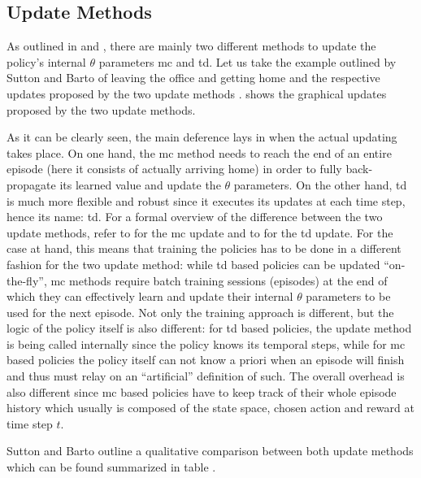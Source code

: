 \documentclass{seal_thesis}
\begin{document}
\subsection{Update Methods}
\label{subsec:update_methods}

As outlined in  and , there are mainly two different methods to update the policy's internal $\theta$ parameters \ie \gls{mc} and \gls{td}. Let us take the example outlined by Sutton and Barto of leaving the office and getting home and the respective updates proposed by the two update methods \cite[p. 130]{Sutton2017}.  shows the graphical updates proposed by the two update methods.


As it can be clearly seen, the main deference lays in when the actual updating takes place. On one hand, the \gls{mc} method needs to reach the end of an entire episode (\ie here it consists of actually arriving home) in order to fully back-propagate its learned value and update the $\theta$ parameters. On the other hand, \gls{td} is much more flexible and robust since it executes its updates at each time step, hence its name: \gls{td}.
For a formal overview of the difference between the two update methods, refer to  for the \gls{mc} update and to  for the \gls{td} update.
For the case at hand, this means that training the policies has to be done in a different fashion for the two update method: while \gls{td} based policies can be updated ``on-the-fly'', \gls{mc} methods require batch training sessions (\ie episodes) at the end of which they can effectively learn and update their internal $\theta$ parameters to be used for the next episode. Not only the training approach is different, but the logic of the policy itself is also different: for \gls{td} based policies, the update method is being called internally since the policy knows its temporal steps, while for \gls{mc} based policies the policy itself can not know a priori when an episode will finish and thus must relay on an ``artificial'' definition of such. The overall overhead is also different since \gls{mc} based policies have to keep track of their whole episode history which usually is composed of the state space, chosen action and reward at time step $t$.

Sutton and Barto outline a qualitative comparison between both update methods which can be found summarized in table .
\end{document}
